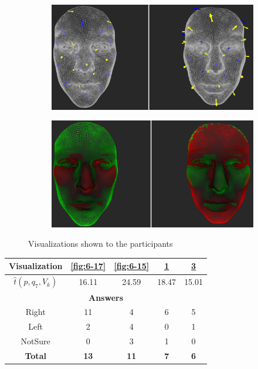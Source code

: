 \begin{figure}[h]
\begin{subfigure}{0.4\textwidth}
\includegraphics[width=\textwidth]{./screenshots/pair18.PNG}
\caption{}
\label{fig:6-18}
\end{subfigure}
\quad
\begin{subfigure}{0.4\textwidth}
\includegraphics[width=\textwidth]{./screenshots/pair16.PNG}
\caption{}
\label{fig:6-16}
\end{subfigure}
\caption{Visualizations shown to the participants}
\end{figure}
\medskip

\begin{center}
\begin{tabular}{| c | c | c | c | c |}
	\hline
	Visualization & \ref{fig:6-17} & \ref{fig:6-15} & \ref{fig:6-18} & \ref{fig:6-16}\\ \hline
	\(\widehat{t}(p, q_7, V_k)\) & 16.11 & 24.59 & 18.47 & 15.01\\ \hline
	\multicolumn{5}{|c|}{\bf Answers} \\ \hline
	Right & 11 & 4 & 6 & 5\\ \hline
	Left & 2 & 4 & 0 & 1\\ \hline
	NotSure & 0 & 3 & 1 & 0\\ \hline
	{\bf Total} & {\bf 13} & {\bf 11} & {\bf 7} & {\bf 6}\\ \hline
\end{tabular}
\end{center}
\clearpage

